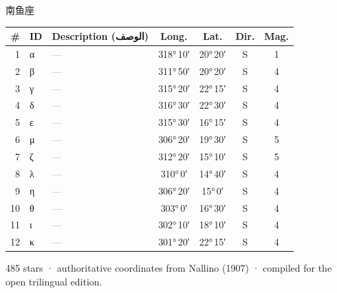 \documentclass[9pt,a4paper]{extarticle}
\newcommand{\ar}[1]{{\arabicfont\textarabic{#1}}}
\begin{document}
\vspace{4pt}\quad\ar{الحوت الجنوبي}\quad 南鱼座
\begin{longtable}{r l >{\raggedright\arraybackslash}p{6.7cm} c c c c}
\toprule \# & ID & Description (\ar{الوصف}) & Long. & Lat. & Dir. & Mag.\\ \midrule\endhead
1 & α & \textcolor{gray}{—} & 318°\,10′ & 20°\,20′ & S & 1\\
2 & β & \textcolor{gray}{—} & 311°\,50′ & 20°\,20′ & S & 4\\
3 & γ & \textcolor{gray}{—} & 315°\,20′ & 22°\,15′ & S & 4\\
4 & δ & \textcolor{gray}{—} & 316°\,30′ & 22°\,30′ & S & 4\\
5 & ε & \textcolor{gray}{—} & 315°\,30′ & 16°\,15′ & S & 4\\
6 & μ & \textcolor{gray}{—} & 306°\,20′ & 19°\,30′ & S & 5\\
7 & ζ & \textcolor{gray}{—} & 312°\,20′ & 15°\,10′ & S & 5\\
8 & λ & \textcolor{gray}{—} & 310°\,0′ & 14°\,40′ & S & 4\\
9 & η & \textcolor{gray}{—} & 306°\,20′ & 15°\,0′ & S & 4\\
10 & θ & \textcolor{gray}{—} & 303°\,0′ & 16°\,30′ & S & 4\\
11 & ι & \textcolor{gray}{—} & 302°\,10′ & 18°\,10′ & S & 4\\
12 & κ & \textcolor{gray}{—} & 301°\,20′ & 22°\,15′ & S & 4\\
\bottomrule\end{longtable}
\vfill\begin{center}\small 485 stars · authoritative coordinates from Nallino (1907) · compiled for the open trilingual edition.\end{center}
\end{document}
